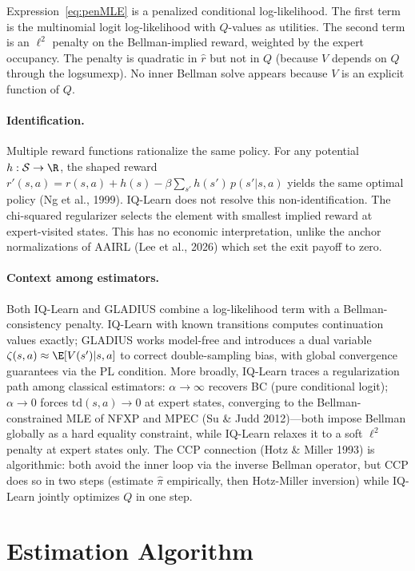 \documentclass[10pt]{article}
\begin{document}
Expression~\eqref{eq:penMLE} is a penalized conditional log-likelihood. The first term is the multinomial logit log-likelihood with $Q$-values as utilities. The second term is an $\ell^2$ penalty on the Bellman-implied reward, weighted by the expert occupancy. The penalty is quadratic in $\hat{r}$ but not in $Q$ (because $V$ depends on $Q$ through the logsumexp). No inner Bellman solve appears because $V$ is an explicit function of $Q$.

\paragraph{Identification.} Multiple reward functions rationalize the same policy. For any potential $h: \mathcal{S} \to \R$, the shaped reward $r'(s,a) = r(s,a) + h(s) - \beta\sum_{s'} h(s')\,p(s'|s,a)$ yields the same optimal policy (Ng et al., 1999). IQ-Learn does not resolve this non-identification. The chi-squared regularizer selects the element with smallest implied reward at expert-visited states. This has no economic interpretation, unlike the anchor normalizations of AAIRL (Lee et al., 2026) which set the exit payoff to zero.

\paragraph{Context among estimators.} Both IQ-Learn and GLADIUS combine a log-likelihood term with a Bellman-consistency penalty. IQ-Learn with known transitions computes continuation values exactly; GLADIUS works model-free and introduces a dual variable $\zeta(s,a) \approx \E[V(s')|s,a]$ to correct double-sampling bias, with global convergence guarantees via the PL condition. More broadly, IQ-Learn traces a regularization path among classical estimators: $\alpha\!\to\!\infty$ recovers BC (pure conditional logit); $\alpha\!\to\!0$ forces $\mathrm{td}(s,a)\!\to\!0$ at expert states, converging to the Bellman-constrained MLE of NFXP and MPEC (Su \& Judd 2012)---both impose Bellman globally as a hard equality constraint, while IQ-Learn relaxes it to a soft $\ell^2$ penalty at expert states only. The CCP connection (Hotz \& Miller 1993) is algorithmic: both avoid the inner loop via the inverse Bellman operator, but CCP does so in two steps (estimate $\hat\pi$ empirically, then Hotz-Miller inversion) while IQ-Learn jointly optimizes $Q$ in one step.


\section{Estimation Algorithm}
\end{document}
